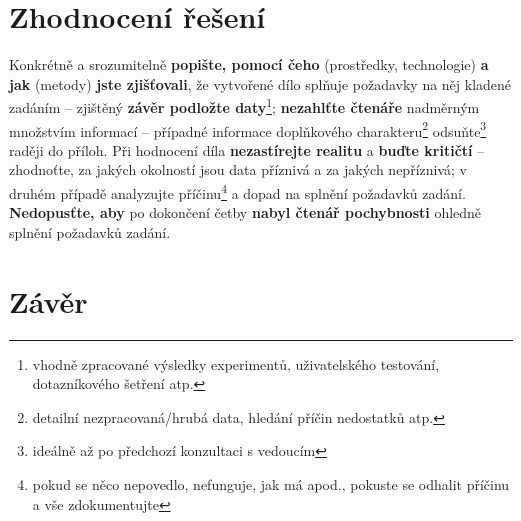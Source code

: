 \documentclass[a4paper,11pt, twoside]{report}
\begin{document}
\pagebreak

\vspace{8mm}

\parbox{\textwidth}{
\centering

\scalebox{2.5}{
\faAreaChart
}
\vspace{-8mm}
}


\section{Zhodnocení řešení}

Konkrétně a srozumitelně \textbf{popište, pomocí čeho} (prostředky, technologie) \textbf{a jak} (metody) \textbf{jste zjišťovali}, že vytvořené dílo splňuje požadavky na něj kladené zadáním -- zjištěný \textbf{závěr podložte daty}\footnote{vhodně zpracované výsledky experimentů, uživatelského testování, dotazníkového šetření atp.};  
\textbf{nezahlťte čtenáře} nadměrným množstvím informací -- případné informace doplňkového charakteru\footnote{detailní nezpracovaná/hrubá data, hledání příčin nedostatků atp.} odsuňte\footnote{ideálně až po předchozí konzultaci s vedoucím} raději do příloh.
Při hodnocení díla 
\textbf{nezastírejte realitu} a
\textbf{buďte kritičtí} -- zhodnoťte, za jakých okolností jsou data příznivá a za jakých nepříznivá; v druhém případě analyzujte příčinu\footnote{pokud se něco nepovedlo, nefunguje, jak má apod., pokuste se odhalit příčinu a vše zdokumentujte} a dopad na splnění požadavků zadání. 
\textbf{Nedopusťte, aby} po dokončení četby \textbf{nabyl čtenář pochybnosti} ohledně splnění požadavků zadání.




\vspace{8mm}

\parbox{\textwidth}{
\centering

\scalebox{2.5}{
\faLegal
}
\vspace{-8mm}
}



\section{Závěr}
\end{document}
